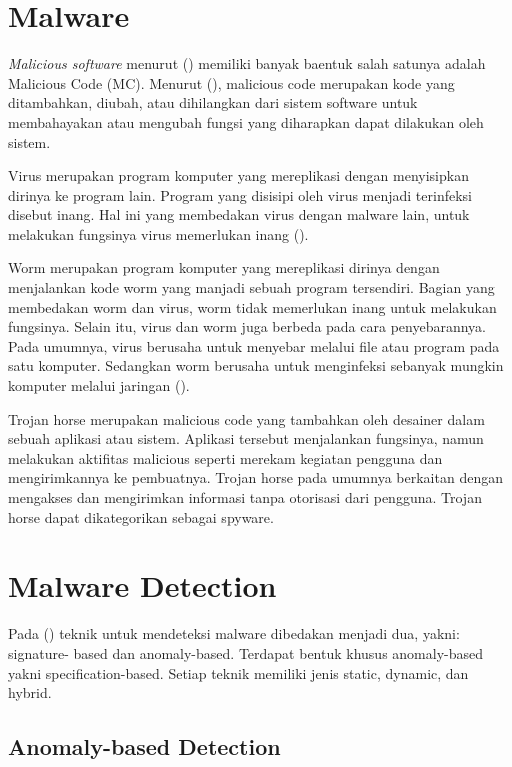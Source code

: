 \section{Malware}
\textit{Malicious software} menurut (\cite{idika2007survey}) memiliki banyak baentuk salah satunya adalah Malicious Code (MC). Menurut (\cite{attackingmalcode}), malicious code merupakan kode yang ditambahkan, diubah, atau dihilangkan dari sistem software untuk membahayakan atau mengubah fungsi yang diharapkan dapat dilakukan oleh sistem.

Virus merupakan program komputer yang mereplikasi dengan menyisipkan dirinya ke program lain. Program yang disisipi oleh virus menjadi terinfeksi disebut inang. Hal ini yang membedakan virus dengan malware lain, untuk melakukan fungsinya virus memerlukan inang (\cite{attackingmalcode}).

Worm merupakan program komputer yang mereplikasi dirinya dengan menjalankan kode worm yang manjadi sebuah program tersendiri. Bagian yang membedakan worm dan virus, worm tidak memerlukan inang untuk melakukan fungsinya. Selain itu, virus dan worm juga berbeda pada cara penyebarannya. Pada umumnya, virus berusaha untuk menyebar melalui file atau program pada satu komputer. Sedangkan worm berusaha untuk menginfeksi sebanyak mungkin komputer melalui jaringan (\cite{attackingmalcode}).

Trojan horse merupakan malicious code yang tambahkan oleh desainer dalam sebuah aplikasi atau sistem. Aplikasi tersebut menjalankan fungsinya, namun melakukan aktifitas malicious seperti merekam kegiatan pengguna dan mengirimkannya ke pembuatnya. Trojan horse pada umumnya berkaitan dengan mengakses dan mengirimkan informasi tanpa otorisasi dari pengguna. Trojan horse dapat dikategorikan sebagai spyware. 


\section{Malware Detection}

Pada (\cite{idika2007survey}) teknik untuk mendeteksi malware dibedakan menjadi dua, yakni: signature-
based dan anomaly-based. Terdapat bentuk khusus anomaly-based yakni specification-based. Setiap teknik memiliki jenis static, dynamic, dan hybrid.

\subsection{Anomaly-based Detection}

